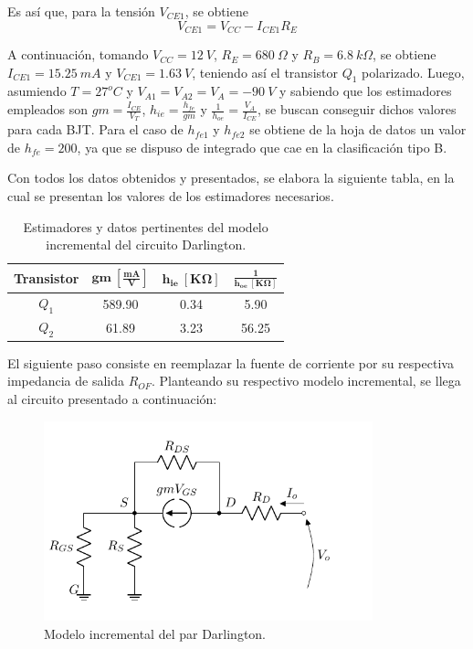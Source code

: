 Es así que, para la tensión $V_{CE1}$, se obtiene
\begin{equation}
	V_{CE1} = V_{CC} - I_{CE1} R_E
\end{equation}

A continuación, tomando $V_{CC} = 12 \ V$, $R_E = 680 \ \Omega$ y $R_B = 6.8 \ k\Omega$, se obtiene $I_{CE1} = 15.25 \ mA$ y $V_{CE1} = 1.63 \ V$, teniendo así el transistor $Q_1$ polarizado. Luego, asumiendo $T = 27^o C$ y $V_{A1} = V_{A2} = V_A = -90 \ V$ y sabiendo que los estimadores empleados son $gm = \frac{I_{CE}}{V_T}$, $h_{ie} = \frac{h_{fe}}{gm}$ y $\frac{1}{h_{oe}} = \frac{V_A}{I_{CE}}$, se buscan conseguir dichos valores para cada BJT. Para el caso de $h_{fe1}$ y $h_{fe2}$ se obtiene de la hoja de datos un valor de $h_{fe} = 200$, ya que se dispuso de integrado que cae en la clasificación tipo B. 

Con todos los datos obtenidos y presentados, se elabora la siguiente tabla, en la cual se presentan los valores de los estimadores necesarios.
\begin{table}[H]
\centering
\begin{tabular}{cccc}
\hline
\textbf{Transistor} & $\mathbf{gm \ \left[ \frac{mA}{V} \right]}$ & $\mathbf{h_{ie} \ \left[ K\Omega \right]}$ & $\mathbf{\frac{1}{h_{oe} \ \left[ K\Omega \right]}}$ \\
\hline
$Q_1$ & 589.90 & 0.34 & 5.90 \\
$Q_2$ & 61.89 & 3.23 & 56.25	\\
\hline
\end{tabular}
\caption{Estimadores y datos pertinentes del modelo incremental del circuito Darlington.}
\label{tab:estim}
\end{table}

El siguiente paso consiste en reemplazar la fuente de corriente por su respectiva impedancia de salida $R_{OF}$. Planteando su respectivo modelo incremental, se llega al circuito presentado a continuación: 
\begin{figure}[H]
\centering
	\includegraphics[width=0.85\textwidth, page=3]{Imagenes/ModeloIncremental.pdf}
	\caption{Modelo incremental del par Darlington.}
\label{fig:incdar}
\end{figure}

